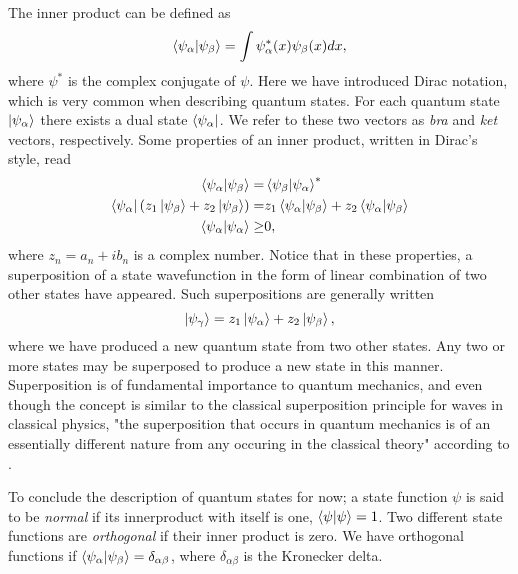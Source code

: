     The inner product can be defined as 
    \begin{equation}
        \braket{\psi_\alpha}{\psi_\beta} = \int \psi_\alpha^*(x) \psi_\beta(x)dx,
    \end{equation}
    where $\psi^*$ is the complex conjugate of $\psi$. Here we have introduced 
    Dirac notation, which is very common when describing quantum states. For each 
    quantum state $\ket{\psi_\alpha}$ there exists a dual state $\bra{\psi_\alpha}$.
    We refer to these two vectors as \emph{bra} and \emph{ket} vectors, respectively.
    Some properties of an inner product, written in Dirac's style, read
    \begin{align}
        \braket{\psi_\alpha}{\psi_\beta} =& \braket{\psi_\beta}{\psi_\alpha}^* \\
        \bra{\psi_\alpha}\left(z_1\ket{\psi_\beta} + z_2 \ket{\psi_\beta}\right)
            =& z_1 \braket{\psi_\alpha}{\psi_\beta} + z_2\braket{\psi_\alpha}{\psi_\beta} \\
        \braket{\psi_\alpha} \geq& 0,
    \end{align}
    where $z_n = a_n + ib_n$ is a complex number. Notice that in these properties, a 
    superposition of a state wavefunction in the form of linear combination of two other 
    states have appeared. Such superpositions are generally written
    \begin{equation}
        \label{eq:superposition}
        \ket{\psi_\gamma} = z_1\ket{\psi_\alpha} + z_2\ket{\psi_\beta},
    \end{equation}
    where we have produced a new quantum state from two other states. Any two or more
    states may be superposed to produce a new state in this manner. Superposition is of fundamental 
    importance to quantum mechanics, and even though the concept is similar to the 
    classical superposition principle for waves in classical physics, "the superposition 
    that occurs in quantum mechanics is of an essentially different nature from any 
    occuring in the classical theory" according 
    to \citeauthor{dirac1930principles} \cite{dirac1930principles}.

    To conclude the description of quantum states for now; a state function $\psi$ is said 
    to be \emph{normal} if its innerproduct with itself is one, $\braket{\psi}{\psi} = 1$.
    Two different state functions are \emph{orthogonal} if their inner product is zero. 
    We have orthogonal functions if $\braket{\psi_\alpha}{\psi_\beta} = \delta_{\alpha\beta}$,
    where $\delta_{\alpha\beta}$ is the Kronecker delta.


